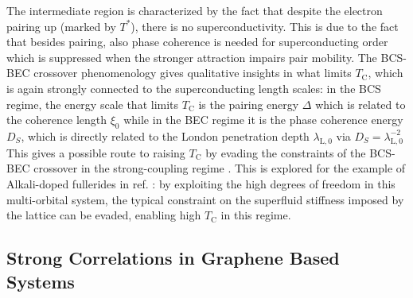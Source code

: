 \documentclass[../notes.tex]{subfiles}
\begin{document}
The intermediate region is characterized by the fact that despite the electron pairing up (marked by \(T^*\)), there is no superconductivity.
This is due to the fact that besides pairing, also phase coherence is needed for superconducting order which is suppressed when the stronger attraction impairs pair mobility.
The BCS-BEC crossover phenomenology gives qualitative insights in what limits \(T_{\mathrm{C}}\), which is again strongly connected to the superconducting length scales: in the BCS regime, the energy scale that limits \(T_{\mathrm{C}}\) is the pairing energy \(\Delta\) which is related to the coherence length \(\xi_0\) while in the BEC regime it is the phase coherence energy \(D_S\), which is directly related to the London penetration depth \(\lambda_{\mathrm{L}, 0}\) via \(D_S = \lambda_{\mathrm{L}, 0}^{-2}\)
This gives a possible route to raising \(T_{\mathrm{C}}\) by evading the constraints of the BCS-BEC crossover in the strong-coupling regime \cite{emeryImportancePhaseFluctuations1995, kivelsonMakingHighTc2002}.
This is explored for the example of Alkali-doped fullerides in ref. \cite{wittBypassingLatticeBCS2024}: by exploiting the high degrees of freedom in this multi-orbital system, the typical constraint on the superfluid stiffness imposed by the lattice can be evaded, enabling high \(T_{\mathrm{C}}\) in this regime.

\subsection*{Strong Correlations in Graphene Based Systems}
\end{document}
